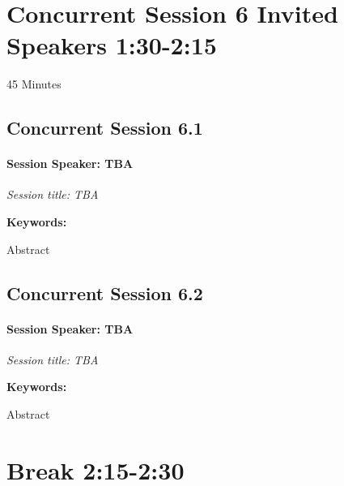 \documentclass[
]{book}
\begin{document}
\hypertarget{concurrent-session-6-invited-speakers-130-215}{%
\section*{Concurrent Session 6 \textbar{} Invited Speakers \textbar{} 1:30-2:15}\label{concurrent-session-6-invited-speakers-130-215}}

45 Minutes

\hypertarget{concurrent-session-6.1}{%
\subsection*{Concurrent Session 6.1}\label{concurrent-session-6.1}}

\begin{speaker}
\hypertarget{session-speaker-tba}{%
\paragraph{\texorpdfstring{Session Speaker:
\textbf{TBA}}{Session Speaker: TBA}}\label{session-speaker-tba}}

\emph{Session title: TBA}

\textbf{Keywords:}

Abstract
\end{speaker}

\hypertarget{concurrent-session-6.2}{%
\subsection*{Concurrent Session 6.2}\label{concurrent-session-6.2}}

\begin{speaker}
\hypertarget{session-speaker-tba}{%
\paragraph{\texorpdfstring{Session Speaker:
\textbf{TBA}}{Session Speaker: TBA}}\label{session-speaker-tba}}

\emph{Session title: TBA}

\textbf{Keywords:}

Abstract
\end{speaker}

\hypertarget{break-215-230}{%
\section*{Break \textbar{} 2:15-2:30}\label{break-215-230}}
\end{document}
